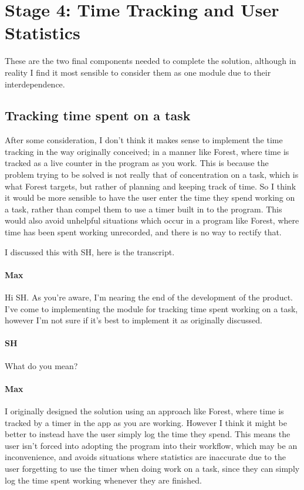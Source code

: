 \documentclass{article}
\begin{document}
\section{Stage 4: Time Tracking and User Statistics}
These are the two final components needed to complete the solution,
although in reality I find it most sensible to consider them as one module due to their interdependence.

\subsection{Tracking time spent on a task}
After some consideration,
I don't think it makes sense to implement the time tracking in the way originally conceived;
in a manner like Forest,
where time is tracked as a live counter in the program as you work.
This is because the problem trying to be solved is not really that of concentration on a task,
which is what Forest targets,
but rather of planning and keeping track of time.
So I think it would be more sensible to have the user enter the time they spend working on a task,
rather than compel them to use a timer built in to the program.
This would also avoid unhelpful situations which occur in a program like Forest,
where time has been spent working unrecorded,
and there is no way to rectify that.

I discussed this with SH,
here is the transcript.

\paragraph{Max} Hi SH.
As you're aware,
I'm nearing the end of the development of the product.
I've come to implementing the module for tracking time spent working on a task,
however I'm not sure if it's best to implement it as originally discussed.
\paragraph{SH} What do you mean?
\paragraph{Max} I originally designed the solution using an approach like Forest,
where time is tracked by a timer in the app as you are working.
However I think it might be better to instead have the user simply log the time they spend.
This means the user isn't forced into adopting the program into their workflow,
which may be an inconvenience,
and avoids situations where statistics are inaccurate due to the user forgetting to use the timer when doing work on a task,
since they can simply log the time spent working whenever they are finished.
\end{document}
